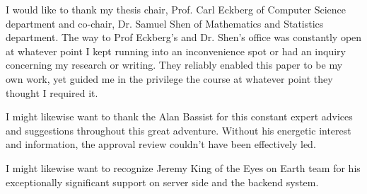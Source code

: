 \documentclass{sdsu-thesis}
\theoremstyle{dtm}
\begin{document}
\renewcommand*{\glsclearpage}{}
\begin{glossarypage}
  \centering
  \glsaddall\printglossary
\end{glossarypage}

\begin{acknowledgments}
I would like to thank my thesis chair, Prof. Carl Eckberg of Computer Science department and co-chair, Dr. Samuel Shen of Mathematics and Statistics department. The way to Prof Eckberg's and Dr. Shen's office was constantly open at whatever point I kept running into an inconvenience spot or had an inquiry concerning my research or writing. They reliably enabled this paper to be my own work, yet guided me in the privilege the course at whatever point they thought I required it. 

I might likewise want to thank the Alan Bassist for this constant expert advices and suggestions throughout this great adventure. Without his energetic interest and information, the approval review couldn't have been effectively led. 

I might likewise want to recognize Jeremy King of the Eyes on Earth team for his exceptionally significant support on server side and the backend system.
\end{acknowledgments}
%
%
% 
% 






% 
% 
% 



% 
% 
% 
\end{document}
